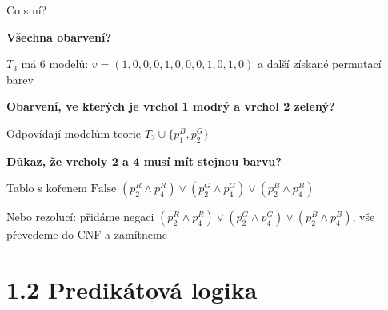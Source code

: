 \documentclass{beamer}
\begin{document}
\begin{frame}{Co s ní?}

\textbf{Všechna obarvení?} 

$T_3$ má 6 modelů: \( v = (1,0,0,0,1,0,0,0,1,0,1,0) \) a další získané permutací barev \vspace{-12pt}
\begin{center}
\end{center}

\textbf{Obarvení, ve kterých je vrchol 1 modrý a vrchol 2 zelený?} 

Odpovídají modelům teorie \( T_3 \cup \{ p_1^B, p_2^G\} \)

\textbf{Důkaz, že vrcholy 2 a 4 musí mít stejnou barvu?}

\alert{Tablo} s kořenem $\text{False  }(p_2^R \land p_4^R)\lor(p_2^G \land p_4^G)\lor(p_2^B \land p_4^B)$

Nebo \alert{rezolucí}: přidáme \alert{negaci} \( (p_2^R \land p_4^R)\lor(p_2^G \land p_4^G)\lor(p_2^B \land p_4^B) \), vše převedeme do CNF a zamítneme

\end{frame}


\section{1.2 Predikátová logika}
\end{document}
